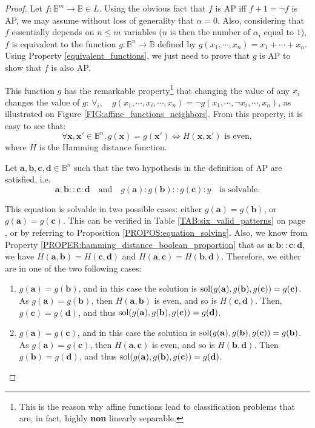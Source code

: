 \begin{proof}
  Let $f \colon \mathbb{B}^m \to \mathbb{B} \in L$. Using the obvious fact that
  $f$ is AP  iff $f + 1 = \neg f$ is AP, we may assume without loss of
  generality that $\alpha = 0$. Also, considering that $f$ essentially depends
  on $n \leq m$ variables ($n$ is then the number of $\alpha_i$ equal to $1$),
  $f$ is equivalent to the function $g \colon \mathbb{B}^n \to \mathbb{B}$
  defined by $g(x_1, \cdots, x_n) = x_1 +  \cdots + x_n$. Using Property
  \ref{equivalent_functions}, we just need to prove that $g$ is AP to show that
  $f$ is also AP.

  This function $g$ has the remarkable property\footnote{This is the reason why
  affine functions lead to classification problems that are, in fact, highly
  \textbf{non} linearly separable.} that changing the value of any $x_i$
  changes the value of $g$: $\forall _i, \quad g(x_1, \cdots, x_i, \cdots, x_n)
  = \neg g(x_1, \cdots, \neg x_i, \cdots, x_n)$, as illustrated on Figure
  \ref{FIG:affine_functions_neighbors}. From this property, it is easy to see
  that:
  $$\forall \mathbf{x}, \mathbf{x}' \in \mathbb{B}^n, g(\mathbf{x}) =
  g(\mathbf{x}') \iff H(\mathbf{x}, \mathbf{x}') \text{ is even},$$
  where $H$ is the Hamming distance function.

  Let $\mathbf{a}, \mathbf{b}, \mathbf{c}, \mathbf{d} \in \mathbb{B}^n$  such
  that the two hypothesis in the definition of AP are satisfied, i.e.
  $$
  \mathbf{a} : \mathbf{b} :: \mathbf{c} : \mathbf{d}\quad \text{and}\quad
  g(\mathbf{a}) : g(\mathbf{b}) :: g(\mathbf{c}) : y\quad  \text{is  solvable}.
  $$

  This equation is solvable in two possible cases: either $g(\mathbf{a}) =
  g(\mathbf{b})$, or $g(\mathbf{a}) = g(\mathbf{c})$. This can be verified in
  Table \ref{TAB:six_valid_patterns} on page \pageref{TAB:six_valid_patterns},
  or by referring to Proposition \ref{PROPOS:equation_solving}.
  Also, we know from Property \ref{PROPER:hamming_distance_boolean_proportion}
  that as $\mathbf{a} : \mathbf{b} :: \mathbf{c} : \mathbf{d}$, we have
  $H(\mathbf{a}, \mathbf{b}) = H(\mathbf{c}, \mathbf{d})$ and $H(\mathbf{a},
  \mathbf{c}) = H(\mathbf{b}, \mathbf{d})$.
  Therefore, we either are in one of the two following cases:
  \begin{enumerate}
    \item $g(\mathbf{a}) = g(\mathbf{b})$, and in this case the solution is
      $\text{sol}(g(\mathbf{a}), g(\mathbf{b}), g(\mathbf{c})) = g(\mathbf{c})$. As
      $g(\mathbf{a}) = g(\mathbf{b})$, then $H(\mathbf{a}, \mathbf{b})$ is
      even, and so is $H(\mathbf{c}, \mathbf{d})$. Then, $g(\mathbf{c}) =
      g(\mathbf{d})$, and thus $\text{sol}(g(\mathbf{a}), g(\mathbf{b}),
      g(\mathbf{c})) = g(\mathbf{d})$.
    \item $g(\mathbf{a}) = g(\mathbf{c})$, and in this case the solution is
      $\text{sol}(g(\mathbf{a}), g(\mathbf{b}), g(\mathbf{c})) = g(\mathbf{b})$. As
      $g(\mathbf{a}) = g(\mathbf{c})$, then $H(\mathbf{a}, \mathbf{c})$ is
      even, and so is $H(\mathbf{b}, \mathbf{d})$. Then $g(\mathbf{b}) =
      g(\mathbf{d})$, and thus $\text{sol}(g(\mathbf{a}), g(\mathbf{b}),
      g(\mathbf{c})) = g(\mathbf{d})$.
  \end{enumerate}


\end{proof}
